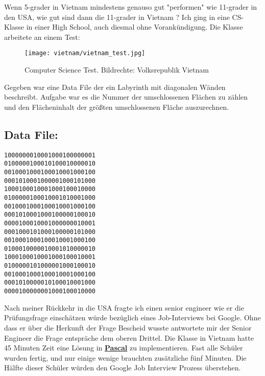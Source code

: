 \documentclass[10pt,a4paper,ngerman,twoside]{article} %
\begin{document}
Wenn 5-grader in Vietnam mindestens genauso gut "performen" wie 11-grader in den USA, wie gut sind dann die 11-grader in Vietnam ? Ich ging in eine CS-Klasse in einer High School, auch diesmal ohne Vorankündigung. Die Klasse arbeitete an einem Test:

\begin{figure}
\texttt{[image: vietnam/vietnam\_test.jpg]}
\caption{Computer Science Test. Bildrechte: Volksrepublik Vietnam}
\end{figure}

Gegeben war eine Data File der ein Labyrinth mit diagonalen Wänden beschreibt. Aufgabe war es die Nummer der umschlossenen Flächen zu zählen und den Flächeninhalt der größten umschlossenen Fläche auszurechnen.

\subsection*{Data File:}
\large
\texttt{1000000010001000100000001 \\
0100000100010100010000010 \\
0010001000100010001000100 \\
0001010001000001000101000 \\
1000100010001000100010000 \\
0100000100010001010001000 \\
0010001000100010001000100 \\
0001010001000100000100010 \\
0000100010001000000010001 \\
0001000101000100000101000 \\
0010001000100010001000100 \\
0100010000010001010000010 \\
1000100010001000100010001 \\
0100000101000001000100010 \\
0010001000100010001000100 \\
0001010000010100010001000 \\
0000100000001000100010000 \\
}
\normalsize 


Nach meiner Rückkehr in die USA fragte ich einen senior engineer wie er die Prüfungsfrage einschätzen würde bezüglich eines Job-Interviews bei Google. Ohne dass er über die Herkunft der Frage Bescheid wusste antwortete mir der Senior Engineer die Frage entspräche dem oberen Drittel. Die Klasse in Vietnam hatte 45 Minuten Zeit eine Lösung in \href{http://de.wikipedia.org/wiki/Pascal_(Programmiersprache)}{\textbf{Pascal}} zu implementieren. Fast alle Schüler wurden fertig, und nur einige wenige brauchten zusätzliche fünf Minuten. Die Hälfte dieser Schüler würden den Google Job Interview Prozess überstehen.
\end{document}
